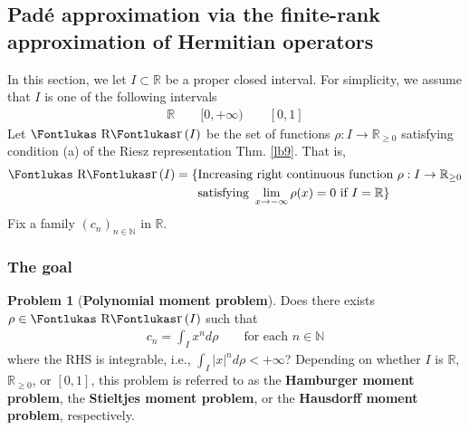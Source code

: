 \documentclass[12pt,b5paper,notitlepage]{article}
\theoremstyle{definition}
\newtheorem{problem}[df]{Problem}
\theoremstyle{plain}
\DeclareMathOperator{\Rr}{\text{\Fontlukas R}\text{\kern -0pt {\Fontlukas\large r}}\,}
\newcommand{\Nbb}{\mathbb N}
\newcommand{\Rbb}{\mathbb R}
\numberwithin{equation}{section}
\begin{document}
\hypertarget{proofread}{}




\subsection{Pad\'e approximation via the finite-rank approximation of Hermitian operators}\label{lb188}



In this section, we let $I\subset\Rbb$ be a proper closed interval. For simplicity, we assume that $I$ is one of the following intervals
\begin{align*}
\Rbb\qquad [0,+\infty)\qquad [0,1]
\end{align*} 
Let $\Rr(I)$ \index{Rr@$\Rr(I)$} be the set of functions $\rho:I\rightarrow\Rbb_{\geq0}$ satisfying condition (a) of the Riesz representation Thm. \ref{lb9}. That is,
\begin{align}\label{eq100}
\begin{aligned}
\Rr(I)=\{&\text{Increasing right continuous function }\rho:I\rightarrow\Rbb_{\geq0}\\
&\text{satisfying }\lim_{x\rightarrow-\infty}\rho(x)=0\text{ if }I=\Rbb\}
\end{aligned}
\end{align}
Fix a family $(c_n)_{n\in\Nbb}$ in $\Rbb$. 

\subsubsection{The goal}



\begin{problem}[\textbf{Polynomial moment problem}] \label{lb162}
Does there exists $\rho\in\Rr(I)$ such that
\begin{align}\label{eq79}
c_n=\int_I x^nd\rho\qquad\text{for each $n\in\Nbb$}
\end{align}
where the RHS is integrable, i.e., $\int_I |x|^nd\rho<+\infty$? Depending on whether $I$ is $\Rbb$, $\Rbb_{\geq0}$, or $[0,1]$, this problem is referred to as the \textbf{Hamburger moment problem},  the \textbf{Stieltjes moment problem},  or the \textbf{Hausdorff moment problem},  respectively.
\end{problem}
\end{document}
